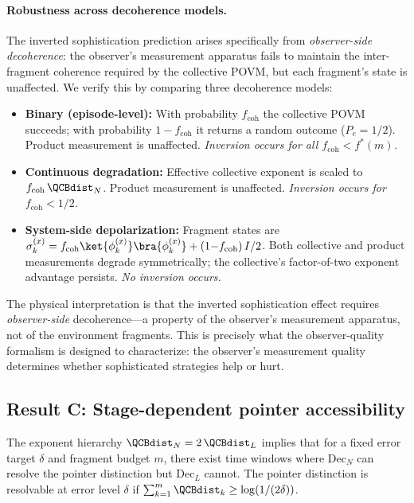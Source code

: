 \paragraph{Robustness across decoherence models.}
The inverted sophistication prediction arises specifically from
\emph{observer-side decoherence}: the observer's measurement apparatus
fails to maintain the inter-fragment coherence required by the collective
POVM, but each fragment's state is unaffected.  We verify this by comparing
three decoherence models:

\begin{itemize}[nosep]
  \item \textbf{Binary (episode-level):}
    With probability $f_{\mathrm{coh}}$ the collective POVM succeeds; with
    probability $1{-}f_{\mathrm{coh}}$ it returns a random outcome ($P_e = 1/2$).
    Product measurement is unaffected.
    \emph{Inversion occurs for all $f_{\mathrm{coh}} < f^*(m)$.}

  \item \textbf{Continuous degradation:}
    Effective collective exponent is scaled to $f_{\mathrm{coh}}\,\QCBdist_N$.
    Product measurement is unaffected.
    \emph{Inversion occurs for $f_{\mathrm{coh}} < 1/2$.}

  \item \textbf{System-side depolarization:}
    Fragment states are $\sigma_k^{(x)} = f_{\mathrm{coh}}\ket{\phi_k^{(x)}}
    \bra{\phi_k^{(x)}} + (1{-}f_{\mathrm{coh}})\,I/2$.
    Both collective and product measurements degrade symmetrically; the
    collective's factor-of-two exponent advantage persists.
    \emph{No inversion occurs.}
\end{itemize}

The physical interpretation is that the inverted sophistication effect
requires \emph{observer-side} decoherence---a property of the observer's
measurement apparatus, not of the environment fragments.  This is precisely
what the observer-quality formalism is designed to characterize: the
observer's measurement quality determines whether sophisticated strategies
help or hurt.


\subsection{Result C: Stage-dependent pointer accessibility}
\label{sec:result_c}

The exponent hierarchy $\QCBdist_N = 2\,\QCBdist_L$ implies that for a
fixed error target $\delta$ and fragment budget $m$, there exist time
windows where Dec$_N$ can resolve the pointer distinction but Dec$_L$
cannot.  The pointer distinction is resolvable at error level $\delta$ if
$\sum_{k=1}^m \QCBdist_k \ge \log(1/(2\delta))$.


